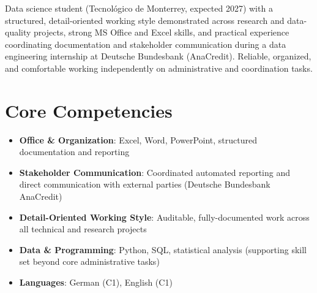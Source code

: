 \documentclass[11pt,a4paper,sans]{moderncv}
\begin{document}
\makecvtitle


\vspace{6pt}
\small{Data science student (Tecnológico de Monterrey, expected 2027) with a structured, detail-oriented working style demonstrated across research and data-quality projects, strong MS Office and Excel skills, and practical experience coordinating documentation and stakeholder communication during a data engineering internship at Deutsche Bundesbank (AnaCredit). Reliable, organized, and comfortable working independently on administrative and coordination tasks.}


\section{Core Competencies}
\vspace{1pt}
\begin{itemize}

\item \textbf{Office \& Organization}: Excel, Word, PowerPoint, structured documentation and reporting

\item \textbf{Stakeholder Communication}: Coordinated automated reporting and direct communication with external parties (Deutsche Bundesbank AnaCredit)

\item \textbf{Detail-Oriented Working Style}: Auditable, fully-documented work across all technical and research projects

\item \textbf{Data \& Programming}: Python, SQL, statistical analysis (supporting skill set beyond core administrative tasks)

\item \textbf{Languages}: German (C1), English (C1)

\end{itemize}

\end{document}
